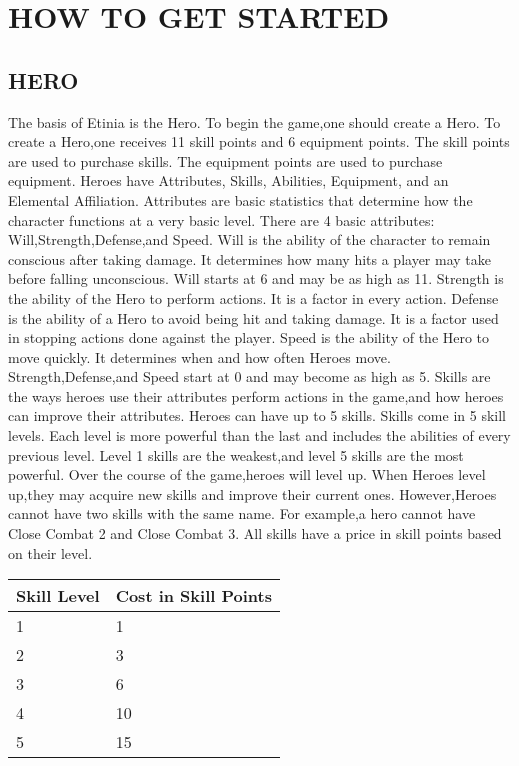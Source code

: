 \section{HOW TO GET STARTED}

\subsection{HERO}
The basis of Etinia is the Hero.  To begin the game,one should
create a Hero.  To create a Hero,one receives 11 skill points and 6 equipment
points.  The skill points are used to purchase skills.  The equipment points
are used to purchase equipment.  Heroes have Attributes, Skills, Abilities,
Equipment, and an Elemental Affiliation.  Attributes are basic statistics that
determine how the character functions at a very basic level.  There are 4 basic
attributes: Will,Strength,Defense,and Speed.  Will is the ability of the
character to remain conscious after taking damage.  It determines how many hits
a player may take before falling unconscious.  Will starts at 6 and may be as
high as 11.  Strength is the ability of the Hero to perform actions.  It is a
factor in every action.  Defense is the ability of a Hero to avoid being hit
and taking damage.  It is a factor used in stopping actions done against the
player.  Speed is the ability of the Hero to move quickly.  It determines when
and how often Heroes move.  Strength,Defense,and Speed start at 0 and may
become as high as 5.  Skills are the ways heroes use their attributes perform
actions in the game,and how heroes can improve their attributes.  Heroes can
have up to 5 skills.  Skills come in 5 skill levels.  Each level is more
powerful than the last and includes the abilities of every previous level.
Level 1 skills are the weakest,and level 5 skills are the most powerful.
Over the course of the game,heroes will level up.  When Heroes level up,they
may acquire new skills and improve their current ones.  However,Heroes cannot
have two skills with the same name.  For example,a hero cannot have Close
Combat 2 and Close Combat 3.  All skills have a price in skill points based on
their level.  


\begin{center}
\begin{tabularx}{\textwidth}{X X}
\hline
Skill Level & Cost in Skill Points \\ \hline
1 & 1 \\
2 & 3 \\
3 & 6 \\
4 & 10 \\
5 & 15 \\
\hline
\end{tabularx}
\end{center}

